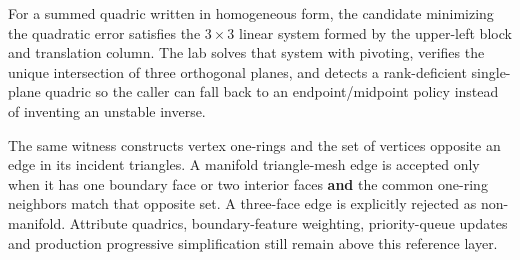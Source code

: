 For a summed quadric written in homogeneous form, the candidate minimizing the quadratic error satisfies the \(3\times3\) linear system formed by the upper-left block and translation column. The lab solves that system with pivoting, verifies the unique intersection of three orthogonal planes, and detects a rank-deficient single-plane quadric so the caller can fall back to an endpoint/midpoint policy instead of inventing an unstable inverse.

The same witness constructs vertex one-rings and the set of vertices opposite an edge in its incident triangles. A manifold triangle-mesh edge is accepted only when it has one boundary face or two interior faces \textbf{and} the common one-ring neighbors match that opposite set. A three-face edge is explicitly rejected as non-manifold. Attribute quadrics, boundary-feature weighting, priority-queue updates and production progressive simplification still remain above this reference layer.
